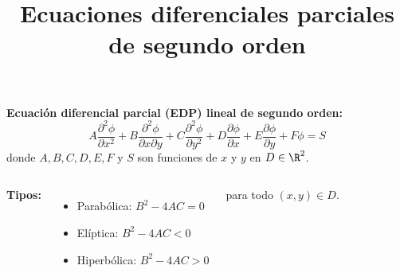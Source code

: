 \documentclass[9pt, aspectratio=169]{beamer}
\title{Ecuaciones diferenciales parciales de segundo orden}
\subtitle{}
\begin{document}
\maketitle

\begin{frame}
    \textbf{Ecuación diferencial parcial (EDP) lineal de segundo orden:}
    \[ A \frac{\partial^2 \phi}{\partial x^2} + B \frac{\partial^2 \phi}{\partial x \partial y} + C \frac{\partial^2 \phi}{\partial y^2} + D \frac{\partial \phi}{\partial x} + E \frac{\partial \phi}{\partial y} + F \phi = S \]
donde $A, B, C, D, E, F$ y $S$ son funciones de $x$ y $y$ en $D \in \R^2$.
\vspace{2em}
\pause

\begin{columns}[t]
\cx
\textbf{Tipos:}
\begin{itemize}
\item \alert<2> {Parabólica: $B^2 - 4 A C = 0$}
\item \alert<3> {Elíptica: $B^2 - 4 A C < 0$}
\item \alert<4> {Hiperbólica: $B^2 - 4 A C > 0$}
\end{itemize}
para todo $(x, y) \in D$.


\end{columns}
\end{frame}
\end{document}
